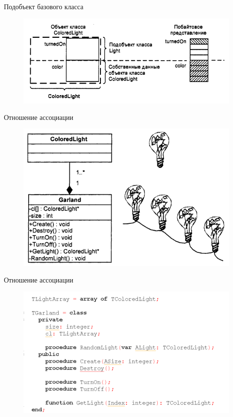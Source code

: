 \documentclass{beamer}
\begin{document}
\begin{frame}{Подобъект базового класса}
\begin{figure}[h]
\centering
\includegraphics[scale=0.7]{images/lec04-pic13.png}
\end{figure}
\end{frame}

\begin{frame}{Отношение ассоциации}
\begin{figure}[h]
\centering
\includegraphics[scale=0.75]{images/lec04-pic14.png}
\end{figure}
\end{frame}

\begin{frame}{Отношение ассоциации}
\begin{figure}[h]
\centering
\includegraphics[scale=0.5]{images/lec04-pic15.png}
\end{figure}
\end{frame}
\end{document}
